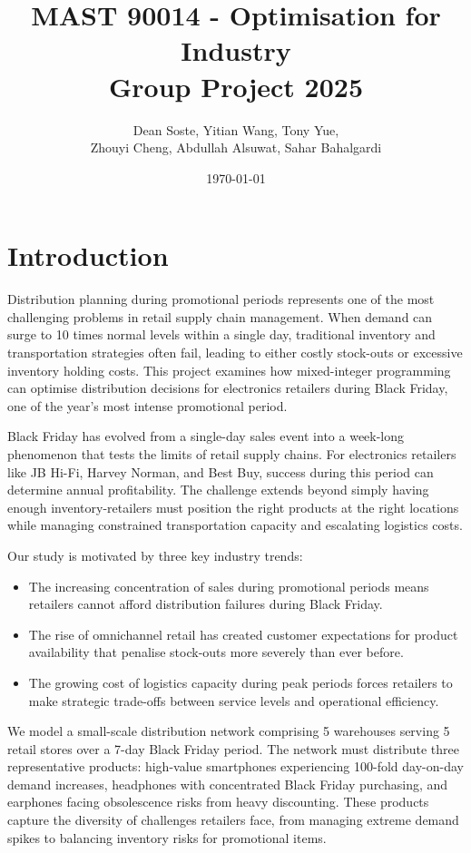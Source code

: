 \documentclass[a4paper,12pt]{article}
\title{MAST 90014 - Optimisation for Industry \\ Group Project 2025}
\author{{Dean Soste}, {Yitian Wang}, {Tony Yue}, \\
{Zhouyi Cheng}, {Abdullah Alsuwat}, {Sahar Bahalgardi}
}
\date{\today}
\begin{document}
\maketitle




\section{Introduction}\label{sec:introduction}

Distribution planning during promotional periods represents one of the most challenging problems in retail supply chain management.
When demand can surge to 10 times normal levels within a single day, traditional inventory and transportation strategies often fail, leading to either costly stock-outs or excessive inventory holding costs.
This project examines how mixed-integer programming can optimise distribution decisions for electronics retailers during Black Friday, one of the year's most intense promotional period.

Black Friday has evolved from a single-day sales event into a week-long phenomenon that tests the limits of retail supply chains.
For electronics retailers like JB Hi-Fi, Harvey Norman, and Best Buy, success during this period can determine annual profitability.
The challenge extends beyond simply having enough inventory-retailers must position the right products at the right locations while managing constrained transportation capacity and escalating logistics costs.

Our study is motivated by three key industry trends:
\begin{itemize}
    \item The increasing concentration of sales during promotional periods means retailers cannot afford distribution failures during Black Friday.
    \item The rise of omnichannel retail has created customer expectations for product availability that penalise stock-outs more severely than ever before.
    \item The growing cost of logistics capacity during peak periods forces retailers to make strategic trade-offs between service levels and operational efficiency.
\end{itemize}

We model a small-scale distribution network comprising 5 warehouses serving 5 retail stores over a 7-day Black Friday period.
The network must distribute three representative products: high-value smartphones experiencing 100-fold day-on-day demand increases, headphones with concentrated Black Friday purchasing, and earphones facing obsolescence risks from heavy discounting.
These products capture the diversity of challenges retailers face, from managing extreme demand spikes to balancing inventory risks for promotional items.
\end{document}
